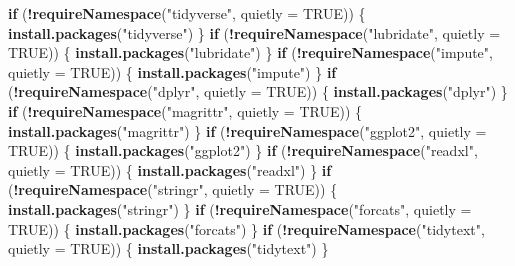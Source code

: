 \documentclass[
]{article}
\newenvironment{Shaded}{\begin{snugshade}}{\end{snugshade}}
\newcommand{\AttributeTok}[1]{\textcolor[rgb]{0.13,0.29,0.53}{#1}}
\newcommand{\ConstantTok}[1]{\textcolor[rgb]{0.56,0.35,0.01}{#1}}
\newcommand{\ControlFlowTok}[1]{\textcolor[rgb]{0.13,0.29,0.53}{\textbf{#1}}}
\newcommand{\FunctionTok}[1]{\textcolor[rgb]{0.13,0.29,0.53}{\textbf{#1}}}
\newcommand{\NormalTok}[1]{#1}
\newcommand{\SpecialCharTok}[1]{\textcolor[rgb]{0.81,0.36,0.00}{\textbf{#1}}}
\newcommand{\StringTok}[1]{\textcolor[rgb]{0.31,0.60,0.02}{#1}}
\begin{document}
\begin{Shaded}
\begin{Highlighting}[]
\ControlFlowTok{if}\NormalTok{ (}\SpecialCharTok{!}\FunctionTok{requireNamespace}\NormalTok{(}\StringTok{"tidyverse"}\NormalTok{, }\AttributeTok{quietly =} \ConstantTok{TRUE}\NormalTok{)) \{}
  \FunctionTok{install.packages}\NormalTok{(}\StringTok{"tidyverse"}\NormalTok{)}
\NormalTok{\}}
\ControlFlowTok{if}\NormalTok{ (}\SpecialCharTok{!}\FunctionTok{requireNamespace}\NormalTok{(}\StringTok{"lubridate"}\NormalTok{, }\AttributeTok{quietly =} \ConstantTok{TRUE}\NormalTok{)) \{}
  \FunctionTok{install.packages}\NormalTok{(}\StringTok{"lubridate"}\NormalTok{)}
\NormalTok{\}}
\ControlFlowTok{if}\NormalTok{ (}\SpecialCharTok{!}\FunctionTok{requireNamespace}\NormalTok{(}\StringTok{"impute"}\NormalTok{, }\AttributeTok{quietly =} \ConstantTok{TRUE}\NormalTok{)) \{}
  \FunctionTok{install.packages}\NormalTok{(}\StringTok{"impute"}\NormalTok{)}
\NormalTok{\}}
\ControlFlowTok{if}\NormalTok{ (}\SpecialCharTok{!}\FunctionTok{requireNamespace}\NormalTok{(}\StringTok{"dplyr"}\NormalTok{, }\AttributeTok{quietly =} \ConstantTok{TRUE}\NormalTok{)) \{}
  \FunctionTok{install.packages}\NormalTok{(}\StringTok{"dplyr"}\NormalTok{)}
\NormalTok{\}}
\ControlFlowTok{if}\NormalTok{ (}\SpecialCharTok{!}\FunctionTok{requireNamespace}\NormalTok{(}\StringTok{"magrittr"}\NormalTok{, }\AttributeTok{quietly =} \ConstantTok{TRUE}\NormalTok{)) \{}
  \FunctionTok{install.packages}\NormalTok{(}\StringTok{"magrittr"}\NormalTok{)}
\NormalTok{\}}
\ControlFlowTok{if}\NormalTok{ (}\SpecialCharTok{!}\FunctionTok{requireNamespace}\NormalTok{(}\StringTok{"ggplot2"}\NormalTok{, }\AttributeTok{quietly =} \ConstantTok{TRUE}\NormalTok{)) \{}
  \FunctionTok{install.packages}\NormalTok{(}\StringTok{"ggplot2"}\NormalTok{)}
\NormalTok{\}}
\ControlFlowTok{if}\NormalTok{ (}\SpecialCharTok{!}\FunctionTok{requireNamespace}\NormalTok{(}\StringTok{"readxl"}\NormalTok{, }\AttributeTok{quietly =} \ConstantTok{TRUE}\NormalTok{)) \{}
  \FunctionTok{install.packages}\NormalTok{(}\StringTok{"readxl"}\NormalTok{)}
\NormalTok{\}}
\ControlFlowTok{if}\NormalTok{ (}\SpecialCharTok{!}\FunctionTok{requireNamespace}\NormalTok{(}\StringTok{"stringr"}\NormalTok{, }\AttributeTok{quietly =} \ConstantTok{TRUE}\NormalTok{)) \{}
  \FunctionTok{install.packages}\NormalTok{(}\StringTok{"stringr"}\NormalTok{)}
\NormalTok{\}}
\ControlFlowTok{if}\NormalTok{ (}\SpecialCharTok{!}\FunctionTok{requireNamespace}\NormalTok{(}\StringTok{"forcats"}\NormalTok{, }\AttributeTok{quietly =} \ConstantTok{TRUE}\NormalTok{)) \{}
  \FunctionTok{install.packages}\NormalTok{(}\StringTok{"forcats"}\NormalTok{)}
\NormalTok{\}}
\ControlFlowTok{if}\NormalTok{ (}\SpecialCharTok{!}\FunctionTok{requireNamespace}\NormalTok{(}\StringTok{"tidytext"}\NormalTok{, }\AttributeTok{quietly =} \ConstantTok{TRUE}\NormalTok{)) \{}
  \FunctionTok{install.packages}\NormalTok{(}\StringTok{"tidytext"}\NormalTok{)}
\NormalTok{\}}


\end{Highlighting}
\end{Shaded}
\end{document}
